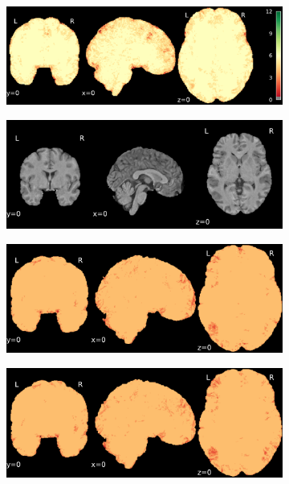 \documentclass{article}
\begin{document}
\begin{landscape}
\begin{figure}
\begin{subfigure}[t]{0.2\paperheight}
        \end{subfigure}
        \begin{subfigure}[t]{0.2\paperheight}
            \centering
            \includegraphics[width=\textwidth]{figures/sig/ds001748_sub-adult16_rr.rs_sig.pdf}
        \end{subfigure}
        \begin{subfigure}[t]{0.2\paperheight}
            \centering
            \includegraphics[width=\textwidth]{figures/ieee_T1/ds002338_sub-xp201_ieee_mean.pdf}
        \end{subfigure}
        \begin{subfigure}[t]{0.2\paperheight}
            \centering
            \includegraphics[width=\textwidth]{figures/sig/ds002338_sub-xp201_rr_sig.pdf}
        \end{subfigure}
        \begin{subfigure}[t]{0.2\paperheight}
            \centering
            \includegraphics[width=\textwidth]{figures/sig/ds002338_sub-xp201_rs_sig.pdf}

\end{subfigure}
\end{figure}
\end{landscape}
\end{document}
